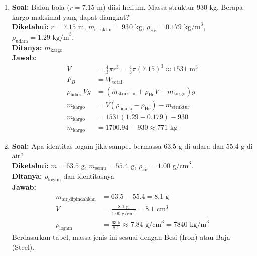 \documentclass[twocolumn]{article}
\begin{document}
\begin{enumerate}
    \item \textbf{Soal:} Balon bola ($r = 7.15 \text{ m}$) diisi helium. Massa struktur 930 kg. Berapa kargo maksimal yang dapat diangkat? \\
    \textbf{Diketahui:} $r = 7.15 \text{ m}$, $m_{\text{struktur}} = 930 \text{ kg}$, $\rho_{\text{He}} = 0.179 \text{ kg/m}^3$, $\rho_{\text{udara}} = 1.29 \text{ kg/m}^3$. \\
    \textbf{Ditanya:} $m_{\text{kargo}}$ \\
    \textbf{Jawab:}
    \begin{align*}
        V &= \frac{4}{3} \pi r^3 = \frac{4}{3} \pi (7.15)^3 \approx 1531 \text{ m}^3 \\
        F_B &= W_{\text{total}} \\
        \rho_{\text{udara}} V g &= (m_{\text{struktur}} + \rho_{\text{He}} V + m_{\text{kargo}}) g \\
        m_{\text{kargo}} &= V(\rho_{\text{udara}} - \rho_{\text{He}}) - m_{\text{struktur}} \\
        m_{\text{kargo}} &= 1531(1.29 - 0.179) - 930 \\
        m_{\text{kargo}} &= 1700.94 - 930 \approx 771 \text{ kg}
    \end{align*}

    \item \textbf{Soal:} Apa identitas logam jika sampel bermassa 63.5 g di udara dan 55.4 g di air? \\
    \textbf{Diketahui:} $m = 63.5 \text{ g}$, $m_{\text{semu}} = 55.4 \text{ g}$, $\rho_{\text{air}} = 1.00 \text{ g/cm}^3$. \\
    \textbf{Ditanya:} $\rho_{\text{logam}}$ dan identitasnya \\
    \textbf{Jawab:}
    \begin{align*}
        m_{\text{air\_dipindahkan}} &= 63.5 - 55.4 = 8.1 \text{ g} \\
        V &= \frac{8.1 \text{ g}}{1.00 \text{ g/cm}^3} = 8.1 \text{ cm}^3 \\
        \rho_{\text{logam}} &= \frac{63.5}{8.1} \approx 7.84 \text{ g/cm}^3 = 7840 \text{ kg/m}^3
    \end{align*}
    Berdasarkan tabel, massa jenis ini sesuai dengan Besi (Iron) atau Baja (Steel).


\end{enumerate}
\end{document}
